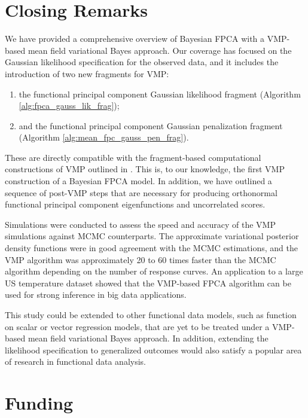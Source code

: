 \documentclass[ba]{imsart}
\numberwithin{equation}{section}
\theoremstyle{plain}
\begin{document}

\section{Closing Remarks}
\label{sec:closing_remarks}

We have provided a comprehensive overview of Bayesian FPCA with a VMP-based mean field variational Bayes
approach. Our coverage has focused on the Gaussian likelihood specification for the observed data, and it
includes the introduction of two new fragments for VMP:

\begin{enumerate}
	\item the functional principal component Gaussian likelihood fragment (Algorithm \ref{alg:fpca_gauss_lik_frag});
	\item and the functional principal component Gaussian penalization fragment (Algorithm
	\ref{alg:mean_fpc_gauss_pen_frag}).
\end{enumerate}

\noindent These are directly compatible with the fragment-based computational constructions of VMP outlined in
\citet{wand17}. This is, to our knowledge, the first VMP construction of a Bayesian FPCA model. In addition,
we have outlined a sequence of post-VMP steps that are necessary for producing orthonormal functional
principal component eigenfunctions and uncorrelated scores.

Simulations were conducted to assess the speed and accuracy of the VMP simulations against MCMC
counterparts. The approximate variational  posterior density functions were in good agreement with the
MCMC estimations, and the VMP algorithm was approximately 20 to 60 times faster than the MCMC
algorithm depending on the number of response curves. An application to a large US temperature dataset
showed that the VMP-based FPCA algorithm can be used for strong inference in big data applications.

This study could be extended to other
functional data models, such as function on scalar or vector regression models, that are yet to be treated
under a VMP-based mean field variational Bayes approach. In addition, extending the likelihood specification to
generalized outcomes would also satisfy a popular area of research in functional data analysis.


\section*{Funding}
\end{document}
